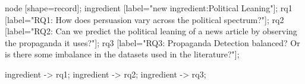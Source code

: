 


 {
    node [shape=record];
    ingredient [label="new ingredient:\gvnewline Political Leaning"];
    rq1 [label="RQ1: How does persuasion vary across the political spectrum?"];
    rq2 [label="RQ2: Can we predict the political leaning of a news article by observing the propaganda it uses?"];
    rq3 [label="RQ3: Propaganda Detection balanced? Or is there some imbalance in the datasets used in the literature?"];
    
    ingredient -> rq1;
    ingredient -> rq2;
    ingredient -> rq3;
}
